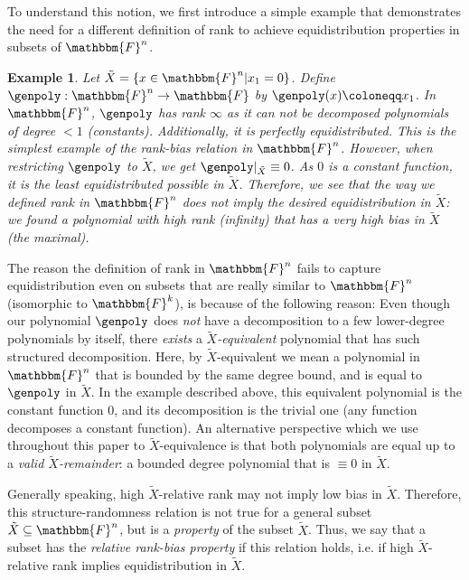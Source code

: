 \documentclass[10pt,a4paper]{article}
\newtheorem{example}[theorem]{Example}
\newcommand{\definedas}[0]{\coloneqq}
\newcommand{\set}[1]{\left\{ #1 \right\}}
\newcommand{\suchthat}[0]{\middle|}
\newcommand{\basefield}[0]{\mathbbm{F}}
\newcommand{\blocklength}[0]{n}
\newcommand{\field}[0]{\basefield^{\blocklength}}
\newcommand{\funcdef}[3]{#1:#2\rightarrow#3}
\newcommand{\restrictfunc}[2]{#1|_{#2}}
\newcommand{\variety}{{\tilde{X}}}
\begin{document}
To understand this notion, we first introduce a simple example that demonstrates the need for a different definition of rank to achieve equidistribution properties in subsets of $\field$.
\begin{example}
    Let $\variety = \set{x \in \field \suchthat x_1 = 0}$.
    Define $\funcdef{\genpoly}{\field}{\basefield}$ by $\genpoly(x) \definedas x_1$.
    \newline
    In $\field$, $\genpoly$ has rank $\infty$ as it can not be decomposed polynomials of degree $< 1$ (constants).
    Additionally, it is perfectly equidistributed.
    This is the simplest example of the rank-bias relation in $\field$.
    \newline
    However, when restricting $\genpoly$ to $\variety$, we get $\restrictfunc{\genpoly}{\variety} \equiv 0$.
    As $0$ is a constant function, it is the \emph{least} equidistributed possible in $\variety$.
    Therefore, we see that the way we defined rank in $\field$ does not imply the desired equidistribution in $\variety$:
    we found a polynomial with high rank (infinity) that has a very high bias \emph{in $\variety$} (the maximal).
\end{example}
The reason the definition of rank in $\field$ fails to capture equidistribution even on subsets that are really similar to $\field$ (isomorphic to $\basefield^k$), is because of the following reason:
Even though our polynomial $\genpoly$ does \emph{not} have a decomposition to a few lower-degree polynomials by itself,
there \emph{exists} a \emph{$\variety$-equivalent} polynomial that has such structured decomposition.
Here, by $\variety$-equivalent we mean a polynomial in $\field$ that is bounded by the same degree bound, and is equal to $\genpoly$ in $\variety$.
In the example described above, this equivalent polynomial is the constant function $0$, and its decomposition is the trivial one (any function decomposes a constant function).
An alternative perspective which we use throughout this paper to $\variety$-equivalence is that both polynomials are equal up to a \emph{valid $\variety$-remainder}: a bounded degree polynomial that is $\equiv 0$ in $\variety$.

Generally speaking, high $\variety$-relative rank may not imply low bias in $\variety$.
Therefore, this structure-randomness relation is not true for a general subset $\variety \subseteq \field$,
but is a \emph{property} of the subset $\variety$.
Thus, we say that a subset has the \emph{relative rank-bias property} if this relation holds,
i.e. if high $\variety$-relative rank implies equidistribution in $\variety$.
\end{document}
